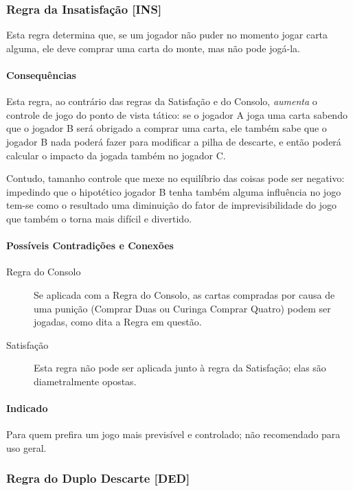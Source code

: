 \subsubsection{Regra da Insatisfação [INS]}

Esta regra determina que, se um jogador não puder no momento jogar carta alguma, ele deve comprar uma carta do monte, mas não pode jogá-la.

\paragraph{Consequências}

Esta regra, ao contrário das regras da Satisfação e do Consolo, \emph{aumenta} o controle de jogo do ponto de vista tático: se o jogador A joga uma carta sabendo que o jogador B será obrigado a comprar uma carta, ele também sabe que o jogador B nada poderá fazer para modificar a pilha de descarte, e então poderá calcular o impacto da jogada também no jogador C.

Contudo, tamanho controle que mexe no equilíbrio das coisas pode ser negativo: impedindo que o hipotético jogador B tenha também alguma influência no jogo tem-se como o resultado uma diminuição do fator de imprevisibilidade do jogo que também o torna mais difícil e divertido.

\paragraph{Possíveis Contradições e Conexões}

\begin{description}
\item[Regra do Consolo]{Se aplicada com a Regra do Consolo, as cartas compradas por causa de uma punição (Comprar Duas ou Curinga Comprar Quatro) podem ser jogadas, como dita a Regra em questão.}
\item[Satisfação]{Esta regra não pode ser aplicada junto à regra da Satisfação; elas são diametralmente opostas.}
\end{description}

\paragraph{Indicado} 

Para quem prefira um jogo mais previsível e controlado; não recomendado para uso geral.

\subsubsection{Regra do Duplo Descarte [DED]}

